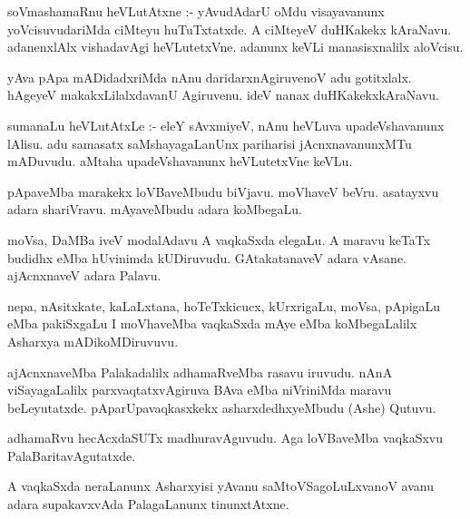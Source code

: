 \documentclass{article}
\begin{document}
\begin{mn}
soVmashamaRnu heVLutAtxne :- yAvudAdarU oMdu visayavanunx  yoVcisuvudariMda 
ciMteyu huTuTxtatxde. A ciMteyeV duHKakekx kAraNavu.  adanenxlAlx vishadavAgi 
heVLutetxVne. adanunx keVLi manasisxnalilx aloVcisu.
\end{mn}

\begin{mn}
yAva pApa mADidadxriMda nAnu daridarxnAgiruvenoV adu gotitxlalx. hAgeyeV 
makakxLilalxdavanU Agiruvenu. ideV nanax duHKakekxkAraNavu. 
\end{mn}

\begin{mn}
sumanaLu heVLutAtxLe :- eleY sAvxmiyeV, nAnu heVLuva upadeVshavanunx  
lAlisu. adu samasatx saMshayagaLanUnx pariharisi jAcnxnavanunxMTu mADuvudu.  
aMtaha  upadeVshavanunx heVLutetxVne keVLu. 
\end{mn}

\begin{mn}
pApaveMba marakekx loVBaveMbudu biVjavu. moVhaveV beVru. asatayxvu adara 
shariVravu. mAyaveMbudu adara koMbegaLu.
\end{mn}

\begin{mn}
moVsa, DaMBa iveV modalAdavu A vaqkaSxda elegaLu. A maravu keTaTx budidhx 
eMba hUvinimda kUDiruvudu. GAtakatanaveV adara vAsane. ajAcnxnaveV adara Palavu.
\end{mn}

\begin{mn}
nepa,  nAsitxkate, kaLaLxtana, hoTeTxkicucx, kUrxrigaLu, moVsa, pApigaLu eMba 
pakiSxgaLu I moVhaveMba vaqkaSxda mAye eMba koMbegaLalilx Asharxya mADikoMDiruvuvu.
\end{mn}

\begin{mn}
ajAcnxnaveMba Palakadalilx adhamaRveMba rasavu iruvudu.  nAnA viSayagaLalilx 
parxvaqtatxvAgiruva BAva eMba niVriniMda maravu beLeyutatxde. pAparUpavaqkasxkekx  
asharxdedhxyeMbudu (Ashe) Qutuvu.
\end{mn}

\begin{mn}
adhamaRvu hecAcxdaSUTx madhuravAguvudu. Aga loVBaveMba vaqkaSxvu PalaBaritavAgutatxde.
\end{mn}

\begin{mn}
 A vaqkaSxda neraLanunx Asharxyisi yAvanu saMtoVSagoLuLxvanoV avanu adara 
 supakavxvAda PalagaLanunx tinunxtAtxne.
\end{mn}
\end{document}
